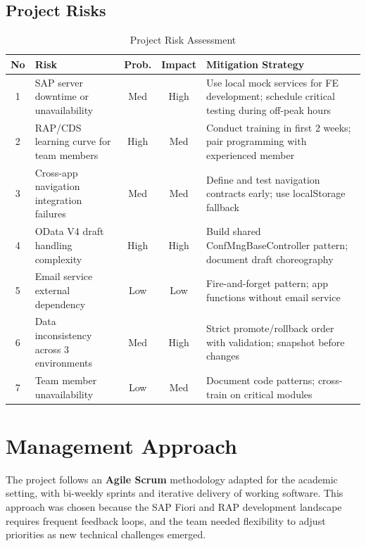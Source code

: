 \documentclass[12pt,a4paper]{report}
\begin{document}
\subsection{Project Risks}

\begin{table}[H]
\centering\small
\begin{tabularx}{\textwidth}{|c|X|c|c|X|}
  \hline
  \rowcolor{tableheadpeach}
  \textbf{No} & \textbf{Risk} & \textbf{Prob.} & \textbf{Impact} & \textbf{Mitigation Strategy} \\ \hline
  1 & SAP server downtime or unavailability
    & Med & High & Use local mock services for FE development; schedule critical testing during off-peak hours \\ \hline
  2 & RAP/CDS learning curve for team members
    & High & Med & Conduct training in first 2 weeks; pair programming with experienced member \\ \hline
  3 & Cross-app navigation integration failures
    & Med & Med & Define and test navigation contracts early; use localStorage fallback \\ \hline
  4 & OData V4 draft handling complexity
    & High & High & Build shared ConfMngBaseController pattern; document draft choreography \\ \hline
  5 & Email service external dependency
    & Low & Low & Fire-and-forget pattern; app functions without email service \\ \hline
  6 & Data inconsistency across 3 environments
    & Med & High & Strict promote/rollback order with validation; snapshot before changes \\ \hline
  7 & Team member unavailability
    & Low & Med & Document code patterns; cross-train on critical modules \\ \hline
\end{tabularx}
\caption{Project Risk Assessment}
\label{tab:risks}
\end{table}


\section{Management Approach}

The project follows an \textbf{Agile Scrum} methodology adapted for the academic setting, with bi-weekly sprints and iterative delivery of working software. This approach was chosen because the SAP Fiori and RAP development landscape requires frequent feedback loops, and the team needed flexibility to adjust priorities as new technical challenges emerged.
\end{document}
